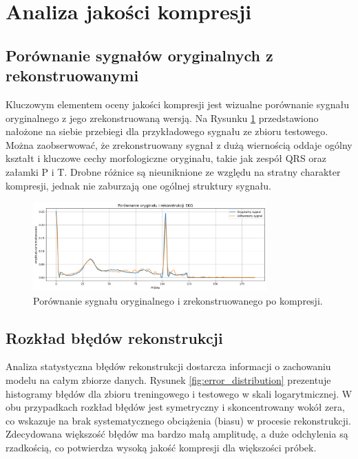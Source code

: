 \documentclass[12pt,a4paper]{article}
\begin{document}
\section{Analiza jakości kompresji}

\subsection{Porównanie sygnałów oryginalnych z rekonstruowanymi}

Kluczowym elementem oceny jakości kompresji jest wizualne porównanie sygnału oryginalnego z jego zrekonstruowaną wersją. Na Rysunku \ref{fig:reconstruction_comparison} przedstawiono nałożone na siebie przebiegi dla przykładowego sygnału ze zbioru testowego. Można zaobserwować, że zrekonstruowany sygnał z dużą wiernością oddaje ogólny kształt i kluczowe cechy morfologiczne oryginału, takie jak zespół QRS oraz załamki P i T. Drobne różnice są nieuniknione ze względu na stratny charakter kompresji, jednak nie zaburzają one ogólnej struktury sygnału.

\begin{figure}[H]
    \centering
    \includegraphics[width=0.8\textwidth]{reconstruction_comparison.png}
    \caption{Porównanie sygnału oryginalnego i zrekonstruowanego po kompresji.}
    \label{fig:reconstruction_comparison}
\end{figure}

\subsection{Rozkład błędów rekonstrukcji}

Analiza statystyczna błędów rekonstrukcji dostarcza informacji o zachowaniu modelu na całym zbiorze danych. Rysunek \ref{fig:error_distribution} prezentuje histogramy błędów dla zbioru treningowego i testowego w skali logarytmicznej. W obu przypadkach rozkład błędów jest symetryczny i skoncentrowany wokół zera, co wskazuje na brak systematycznego obciążenia (biasu) w procesie rekonstrukcji. Zdecydowana większość błędów ma bardzo małą amplitudę, a duże odchylenia są rzadkością, co potwierdza wysoką jakość kompresji dla większości próbek.
\end{document}

